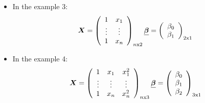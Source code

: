 \begin{frame}
  \begin{itemize}
    \vspace{0.5cm}
    \item In the example 3: 
      $$ 
        \boldsymbol{X} = 
        \left(
          \begin{array}{cc} 
            1 & x_1 \\
            \vdots & \vdots \\
            1 & x_n \\
          \end{array}
        \right)_{n\text{x}2}
        \boldsymbol{\underline{\beta}} =
        \left(
          \begin{array}{c} 
            \beta_0 \\
            \beta_1 \\
          \end{array}
        \right)_{2\text{x}1}
      $$
    \vspace{0.5cm}
    \item In the example 4: 
      $$ 
        \boldsymbol{X} = 
        \left(
          \begin{array}{ccc} 
            1 & x_1 & x_1^2\\
            \vdots & \vdots & \vdots \\
            1 & x_n & x_n^2\\
          \end{array}
        \right)_{n\text{x}3}
        \boldsymbol{\underline{\beta}} =
        \left(
          \begin{array}{c} 
            \beta_0 \\
            \beta_1 \\
            \beta_2
          \end{array}
        \right)_{3\text{x}1}
      $$
  \end{itemize}
\end{frame}


